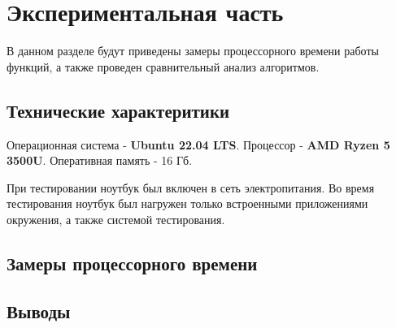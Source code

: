 \section{Экспериментальная часть}
В данном разделе будут приведены замеры процессорного времени работы функций, а также
проведен сравнительный анализ алгоритмов.
\subsection{Технические характеритики}
Операционная система - \textbf{Ubuntu 22.04 LTS}\cite{ubuntu}.
Процессор - \textbf{AMD Ryzen 5 3500U}.
Оперативная память - 16 Гб.

При тестировании ноутбук был включен в сеть электропитания. Во время тестирования ноутбук был нагружен только встроенными приложениями
окружения, а также системой тестирования.
\subsection{Замеры процессорного времени}

\subsection{Выводы}
\pagebreak